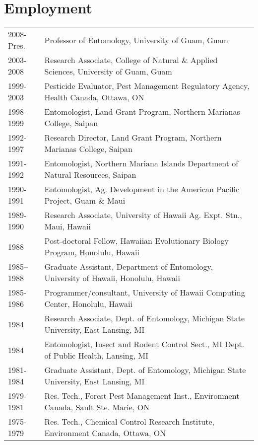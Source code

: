 \documentclass[letterpaper]{article}
\begin{document}
\section{Employment}
\begin{tabular}{ll}
2008-Pres. & Professor of Entomology, University of Guam, Guam\\
2003-2008 & Research Associate, College of Natural \& Applied Sciences, University of	Guam, Guam\\
1999-2003 &	Pesticide Evaluator, Pest Management Regulatory Agency, Health Canada, Ottawa, ON\\
1998-1999  &	Entomologist, Land Grant Program, Northern Marianas College, Saipan\\
1992-1997  &	Research Director, Land Grant Program, Northern Marianas College, Saipan\\
1991-1992 & 	Entomologist, Northern Mariana Islands Department of Natural Resources, Saipan\\
1990-1991  &	Entomologist, Ag. Development in the American Pacific Project, Guam \& Maui\\
1989-1990 & 	Research Associate, University of Hawaii Ag. Expt. Stn., Maui, Hawaii\\
1988 	 &	Post-doctoral Fellow, Hawaiian Evolutionary Biology Program, Honolulu,	Hawaii\\
1985–1988  &	Graduate Assistant, Department of Entomology, University of Hawaii, Honolulu, Hawaii\\
1985-1986  &	Programmer/consultant, University of Hawaii Computing Center, Honolulu, Hawaii\\
1984 	 &	Research Associate, Dept. of Entomology, Michigan State University, East Lansing, MI\\
1984 	 &	Entomologist, Insect and Rodent Control Sect., MI Dept. of Public Health, Lansing, MI\\
1981-1984  &	Graduate Assistant, Dept. of Entomology, Michigan State University, East Lansing, MI\\
1979-1981  &	Res. Tech., Forest Pest Management Inst., Environment Canada, Sault Ste. Marie, ON\\
1975-1979  &	Res. Tech., Chemical Control Research Institute, Environment Canada, Ottawa, ON
\end{tabular}
\end{document}
